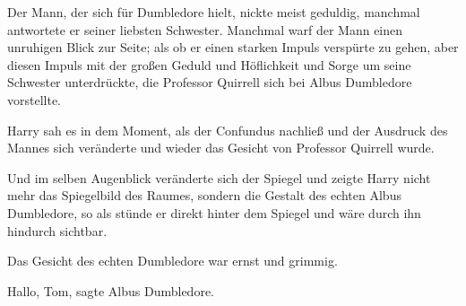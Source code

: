 Der Mann, der sich für Dumbledore hielt, nickte meist geduldig, manchmal
antwortete er seiner liebsten Schwester. Manchmal warf der Mann einen unruhigen
Blick zur Seite; als ob er einen starken Impuls verspürte zu gehen, aber diesen
Impuls mit der großen Geduld und Höflichkeit und Sorge um seine Schwester
unterdrückte, die Professor Quirrell sich bei Albus Dumbledore vorstellte.

Harry sah es in dem Moment, als der Confundus nachließ und der Ausdruck des
Mannes sich veränderte und wieder das Gesicht von Professor Quirrell wurde.

Und im selben Augenblick veränderte sich der Spiegel und zeigte Harry nicht mehr
das Spiegelbild des Raumes, sondern die Gestalt des echten Albus Dumbledore, so
als stünde er direkt hinter dem Spiegel und wäre durch ihn hindurch sichtbar.

Das Gesicht des echten Dumbledore war ernst und grimmig.

\glqq{}Hallo, Tom\grqq{}, sagte Albus Dumbledore.


